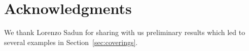 \documentclass[12pt]{amsart}
\theoremstyle{definition}
\numberwithin{equation}{section}
\begin{document}
 

 
 
 
  
 
 
 



 








\section*{Acknowledgments}
We thank Lorenzo Sadun for sharing with us preliminary results which led to several examples in Section~\ref{sec:coverings}.

\providecommand{\bysame}{\leavevmode\hbox to3em{\hrulefill}\thinspace}
\providecommand{\MR}{\relax\ifhmode\unskip\space\fi MR }
\providecommand{\MRhref}[2]{%
  \href{http://www.ams.org/mathscinet-getitem?mr=#1}{#2}
}
\providecommand{\href}[2]{#2}
\end{document}

